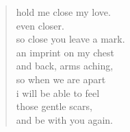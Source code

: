 
\begin{verse}
hold me close my love. \\
even closer. \\
so close you leave a mark. \\
an imprint on my chest \\
and back, arms aching, \\
so when we are apart \\
i will be able to feel \\
those gentle scars, \\
and be with you again.
\end{verse}
